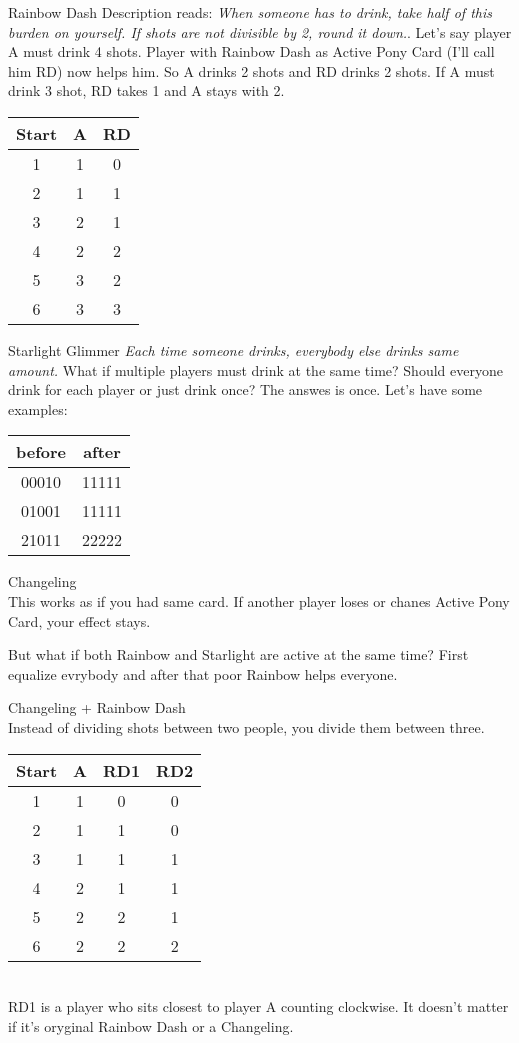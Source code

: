 \documentclass[notitlepage]{article}
\begin{document}
Rainbow Dash\newline
Description reads: \textsl{When someone has to drink, take half of this burden on yourself. If shots are not divisible by 2, round it down.}. 
Let's say player A must drink 4 shots. Player with Rainbow Dash as Active Pony Card (I'll call him RD) now helps him. So A drinks 2 shots and RD drinks 2 shots. If A must drink 3 shot, RD takes 1 and A stays with 2. \\
\begin{tabular}{| c | c | c |}
\hline
Start & A & RD \\ \hline
1 & 1 & 0 \\ \hline
2 & 1 & 1 \\ \hline
3 & 2 & 1 \\ \hline
4 & 2 & 2 \\ \hline
5 & 3 & 2 \\ \hline
6 & 3 & 3 \\ \hline
\end{tabular}

Starlight Glimmer\newline
\textsl{Each time someone drinks, everybody else drinks same amount.} What if multiple players must drink at the same time? Should everyone drink for each player or just drink once? The answes is once. Let's have some examples: \\
\begin{tabular}{|c|c|}
\hline
before & after \\ \hline
00010 & 11111 \\ \hline
01001 & 11111 \\ \hline
21011 & 22222 \\ \hline
\end{tabular}
Changeling\\
This works as if you had same card. If another player loses or chanes Active Pony Card, your effect stays.

But what if both Rainbow and Starlight are active at the same time? First equalize evrybody and after that poor Rainbow helps everyone.

Changeling + Rainbow Dash\\
Instead of dividing shots between two people, you divide them between three.
\begin{tabular}{| c | c | c | c |}
\hline
Start & A & RD1 & RD2 \\ \hline
1 & 1 & 0 & 0 \\ \hline
2 & 1 & 1 & 0 \\ \hline
3 & 1 & 1 & 1 \\ \hline
4 & 2 & 1 & 1 \\ \hline
5 & 2 & 2 & 1 \\ \hline
6 & 2 & 2 & 2 \\ \hline
\end{tabular}\\
RD1 is a player who sits closest to player A counting clockwise. It doesn't matter if it's oryginal Rainbow Dash or a Changeling.
\end{document}
